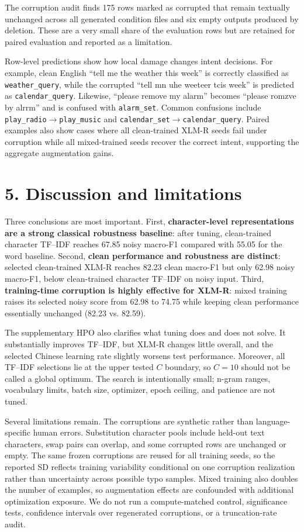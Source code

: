 \documentclass[11pt,a4paper]{article}
\begin{document}
The corruption audit finds 175 rows marked as corrupted that remain textually unchanged across all generated condition files and six empty outputs produced by deletion. These are a very small share of the evaluation rows but are retained for paired evaluation and reported as a limitation.

Row-level predictions show how local damage changes intent decisions. For example, clean English ``tell me the weather this week'' is correctly classified as \texttt{weather\_query}, while the corrupted ``tell mn uhe weeteer tcis week'' is predicted as \texttt{calendar\_query}. Likewise, ``please remove my alarm'' becomes ``please romzve by alrrm'' and is confused with \texttt{alarm\_set}. Common confusions include \texttt{play\_radio}$\rightarrow$\texttt{play\_music} and \texttt{calendar\_set}$\rightarrow$\texttt{calendar\_query}. Paired examples also show cases where all clean-trained XLM-R seeds fail under corruption while all mixed-trained seeds recover the correct intent, supporting the aggregate augmentation gains.

\section*{5. Discussion and limitations}
Three conclusions are most important. First, \textbf{character-level representations are a strong classical robustness baseline}: after tuning, clean-trained character TF--IDF reaches 67.85 noisy macro-F1 compared with 55.05 for the word baseline. Second, \textbf{clean performance and robustness are distinct}: selected clean-trained XLM-R reaches 82.23 clean macro-F1 but only 62.98 noisy macro-F1, below clean-trained character TF--IDF on noisy input. Third, \textbf{training-time corruption is highly effective for XLM-R}: mixed training raises its selected noisy score from 62.98 to 74.75 while keeping clean performance essentially unchanged (82.23 vs. 82.59).

The supplementary HPO also clarifies what tuning does and does not solve. It substantially improves TF--IDF, but XLM-R changes little overall, and the selected Chinese learning rate slightly worsens test performance. Moreover, all TF--IDF selections lie at the upper tested $C$ boundary, so $C=10$ should not be called a global optimum. The search is intentionally small; n-gram ranges, vocabulary limits, batch size, optimizer, epoch ceiling, and patience are not tuned.

Several limitations remain. The corruptions are synthetic rather than language-specific human errors. Substitution character pools include held-out text characters, swap pairs can overlap, and some corrupted rows are unchanged or empty. The same frozen corruptions are reused for all training seeds, so the reported SD reflects training variability conditional on one corruption realization rather than uncertainty across possible typo samples. Mixed training also doubles the number of examples, so augmentation effects are confounded with additional optimization exposure. We do not run a compute-matched control, significance tests, confidence intervals over regenerated corruptions, or a truncation-rate audit.
\end{document}
